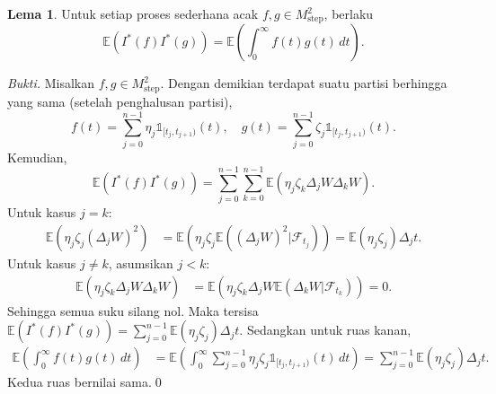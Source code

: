 \documentclass[aspectratio=169,11pt]{beamer}
\theoremstyle{definition}
\newtheorem{lema}{Lema}
\begin{document}
\begin{frame}[allowframebreaks]{\insertsection}{\insertsubsection}
  \begin{lema}
    Untuk setiap proses sederhana acak $f, g \in M_{\text{step}}^2$, berlaku
    \begin{equation*}
      \mathbb{E}(I^*(f)I^*(g)) = \mathbb{E}\left(\int_0^\infty f(t)g(t) \, dt\right).
    \end{equation*}
  \end{lema}
  \textit{Bukti.} Misalkan $f, g \in M_{\text{step}}^2$. Dengan demikian terdapat suatu partisi berhingga yang sama (setelah penghalusan partisi),
  \begin{equation*}
    f(t) = \sum_{j=0}^{n-1} \eta_j \mathds{1}_{[t_j, t_{j+1})}(t), \quad g(t) = \sum_{j=0}^{n-1} \zeta_j \mathds{1}_{[t_j, t_{j+1})}(t).
  \end{equation*}
  Kemudian,
  \begin{equation*}
    \mathbb{E}(I^*(f)I^*(g)) = \sum_{j=0}^{n-1}\sum_{k=0}^{n-1} \mathbb{E}(\eta_j \zeta_k \Delta_j W \Delta_k W).
  \end{equation*}
  Untuk kasus $j = k$:
  \begin{align*}
    \mathbb{E}(\eta_j \zeta_j (\Delta_j W)^2) & = \mathbb{E}(\eta_j \zeta_j \mathbb{E}((\Delta_j W)^2 | \mathcal{F}_{t_j})) = \mathbb{E}(\eta_j \zeta_j) \Delta_j t.
  \end{align*}
  Untuk kasus $j \neq k$, asumsikan $j < k$:
  \begin{align*}
    \mathbb{E}(\eta_j \zeta_k \Delta_j W \Delta_k W) & = \mathbb{E}(\eta_j \zeta_k \Delta_j W \mathbb{E}(\Delta_k W | \mathcal{F}_{t_k}))  = 0.
  \end{align*}
  Sehingga semua suku silang nol.
  Maka tersisa $\mathbb{E}(I^*(f)I^*(g)) = \sum_{j=0}^{n-1} \mathbb{E}(\eta_j \zeta_j) \Delta_j t$.
  Sedangkan untuk ruas kanan,
  \begin{align*}
    \mathbb{E}\left(\int_0^\infty f(t)g(t) \, dt\right) & = \mathbb{E}\left( \int_0^\infty \sum_{j=0}^{n-1} \eta_j \zeta_j \mathds{1}_{[t_j, t_{j+1})}(t) \, dt \right) = \sum_{j=0}^{n-1} \mathbb{E}(\eta_j \zeta_j) \Delta_j t.
  \end{align*}
  Kedua ruas bernilai sama.\qed
\end{frame}
\end{document}
